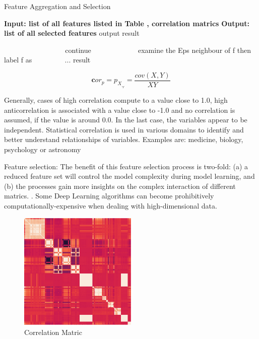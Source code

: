 \documentclass[5p]{elsarticle}
\begin{document}
\begin{algorithm}[t]
\caption{Feature Aggregation and Selection} %
\hspace*{0.02in} {\bf Input: list of all features listed in Table , correlation matrics} %
\hspace*{0.02in} {\bf Output: list of all selected features} %
output result
\begin{algorithmic}[1]
　　　　\State continue
　　\Else
　　　　\State examine the Eps neighbour of f
         then
            label f as
　　\EndIf
\EndFor
{} %
　　\State ...
\EndWhile
\State \Return result
\end{algorithmic}
\end{algorithm}

\begin{equation}
	\mathbf cor_p=p_X_,_Y = \frac{cov(X,Y)}{XY}
\end{equation}

Generally, cases of high correlation compute to a value close to 1.0, high anticorrelation is associated with a value close to -1.0 and no correlation is assumed, if the value is around 0.0. In the last case, the variables appear to be independent. Statistical correlation is used in various domains to identify and better understand relationships of variables. Examples are: medicine, biology, psychology or astronomy

Feature selection: The benefit of this feature selection process is two-fold: (a) a reduced feature set will control the model complexity during model learning, and (b) the processes gain more insights on the complex interaction of different matrics. \cite{Yeom2016Data-DrivenMatrices}. Some Deep Learning algorithms can become prohibitively computationally-expensive when dealing with high-dimensional data. 



\begin{figure}[h]
    \centering
    \includegraphics[width=0.5\textwidth]{Correlation_Matric.png}
    \caption{Correlation Matric}
    \label{fig:Correlation Matric}
\end{figure}
\end{document}
